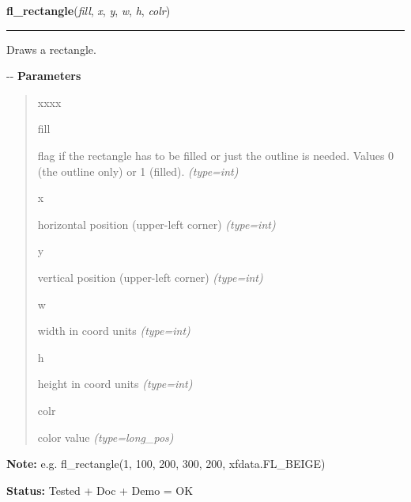 \hspace{.8\funcindent}\begin{boxedminipage}{\funcwidth}

    \raggedright \textbf{fl\_rectangle}(\textit{fill}, \textit{x}, \textit{y}, \textit{w}, \textit{h}, \textit{colr})

    \vspace{-1.5ex}

    \rule{\textwidth}{0.5\fboxrule}
\setlength{\parskip}{2ex}

Draws a rectangle.

-{}-
\setlength{\parskip}{1ex}
      \textbf{Parameters}
      \vspace{-1ex}

      \begin{quote}
        \begin{Ventry}{xxxx}

          \item[fill]


flag if the rectangle has to be filled or just the outline is needed.
Values 0 (the outline only) or 1 (filled).
            {\it (type=int)}

          \item[x]


horizontal position (upper-left corner)
            {\it (type=int)}

          \item[y]


vertical position (upper-left corner)
            {\it (type=int)}

          \item[w]


width in coord units
            {\it (type=int)}

          \item[h]


height in coord units
            {\it (type=int)}

          \item[colr]


color value
            {\it (type=long\_pos)}

        \end{Ventry}

      \end{quote}

\textbf{Note:} 
e.g. fl\_rectangle(1, 100, 200, 300, 200, xfdata.FL\_BEIGE)


\textbf{Status:} 
Tested + Doc + Demo = OK


    \end{boxedminipage}

